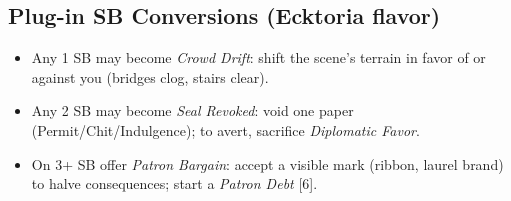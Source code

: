 \subsection*{Plug-in SB Conversions (Ecktoria flavor)}
\begin{itemize}
  \item Any 1 SB may become \emph{Crowd Drift}: shift the scene’s terrain in favor of or against you (bridges clog, stairs clear).
  \item Any 2 SB may become \emph{Seal Revoked}: void one paper (Permit/Chit/Indulgence); to avert, sacrifice \emph{Diplomatic Favor}.
  \item On 3+ SB offer \emph{Patron Bargain}: accept a visible mark (ribbon, laurel brand) to halve consequences; start a \emph{Patron Debt} [6].
\end{itemize}


